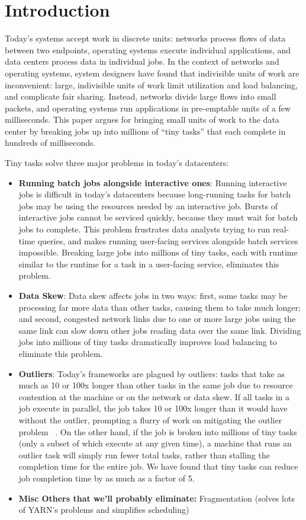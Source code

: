 \section{Introduction}
Today's systems accept work in discrete units: networks process flows of data
between two endpoints, operating systems execute individual applications, and
data centers process data in individual jobs.  In the context of networks and
operating systems, system designers have found that indivisible units of work are
inconvenient: large, indivisible units of work limit utilization and load balancing,
and complicate fair sharing.  Instead, networks divide large flows into small
packets, and operating systems run applications in pre-emptable units of a 
few milliseconds.  This paper argues for
bringing small units of work to the data center by breaking jobs up into
millions of ``tiny tasks'' that each complete in hundreds of milliseconds.

Tiny tasks solve three major problems in today's datacenters:
\begin{itemize}
\item \textbf{Running batch jobs alongside interactive ones}: Running interactive
jobs is difficult in today's datacenters because long-running tasks for batch jobs may be
using the resources needed by an interactive job. Bursts of interactive jobs
cannot be serviced quickly, because they must wait for batch jobs to complete.
This problem frustrates data analysts trying to run real-time queries, and makes
running user-facing services alongside batch services impossible. Breaking large
jobs into millions of tiny tasks, each with runtime similar to the runtime for a
task in a user-facing service, eliminates this problem.
\item \textbf{Data Skew}: Data skew affects jobs in two ways: first, some tasks
may be processing far more data than other tasks, causing them to take much
longer; and second, congested network links due to one or more large jobs using
the same link can slow down other jobs reading data over the same link. Dividing
jobs into millions of tiny tasks dramatically improves load balancing to eliminate
this problem.
\item \textbf{Outliers}: Today's frameworks are plagued by outliers: tasks that
take as much as 10 or 100x longer than other tasks in the same job due to
resource contention at the machine or on the network or data skew.  If all tasks in a job execute in parallel, the job takes 10 or 100x longer than it would
have without the outlier, prompting a flurry of work on mitigating the outlier
problem ~\cite{blah,blah,blah}. On the other hand, if the job is broken into millions of tiny tasks (only a subset of which execute at any given time), a machine
that runs an outlier task will simply run fewer total tasks, rather than
stalling the completion time for the entire job. We have found that tiny tasks can reduce job
completion time by as much as a factor of 5.
\item \textbf{Misc Others that we'll probably eliminate:} Fragmentation (solves
lots of YARN's problems and simplifies scheduling)
\end{itemize}

